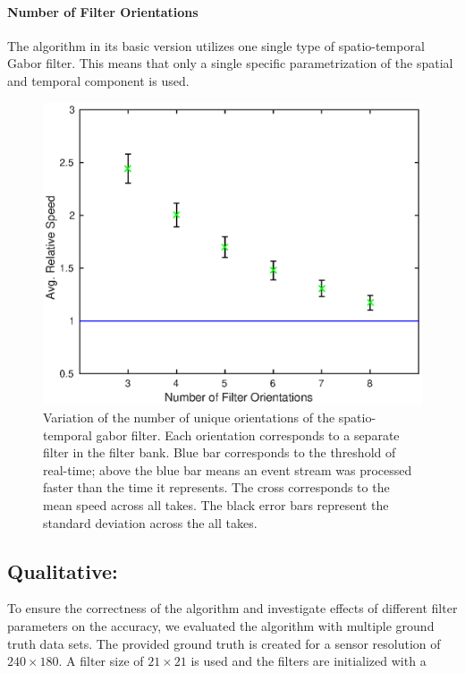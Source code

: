 \paragraph{Number of Filter Orientations}
The algorithm in its basic version utilizes one single type of spatio-temporal Gabor filter.
This means that only a single specific parametrization of the spatial and temporal component is used.
\begin{figure}[!htb]
	\centering
	\includegraphics[scale=.9]{gpu_fo.eps}
	\caption{Variation of the number of unique orientations of the spatio-temporal gabor filter. Each orientation corresponds to a separate filter in the filter bank. Blue bar corresponds to the threshold of real-time; above the blue bar means an event stream was processed faster than the time it represents. The cross corresponds to the mean speed across all takes. The black error bars represent the standard deviation across the all takes.}
	\label{fig:gpu_fo}
\end{figure}

\subsection{Qualitative:} 
To ensure the correctness of the algorithm and investigate effects of different filter parameters on the accuracy, we evaluated the algorithm with multiple ground truth data sets.
The provided ground truth is created for a sensor resolution of $240\times180$.
A filter size of $21\times21$ is used and the filters are initialized with a 


